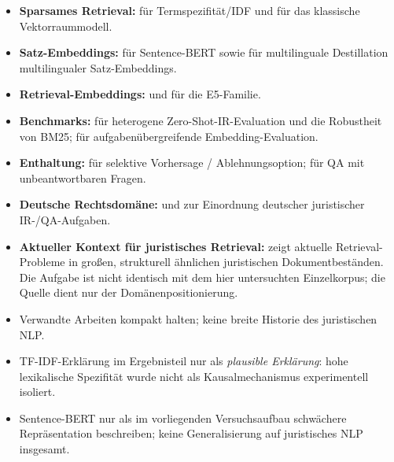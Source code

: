 \documentclass[11pt]{article}
\begin{document}
\begin{quellenbox}
\begin{itemize}
    \item \textbf{Sparsames Retrieval:} \citet{sparckjones1972statistical} f\"ur Termspezifität/IDF und \citet{salton1975vector} f\"ur das klassische Vektorraummodell.
    \item \textbf{Satz-Embeddings:} \citet{reimers-gurevych-2019-sentence} f\"ur Sentence-BERT sowie \citet{reimers-gurevych-2020-making} f\"ur multilinguale Destillation multilingualer Satz-Embeddings.
    \item \textbf{Retrieval-Embeddings:} \citet{wang2022text} und \citet{wang2024multilingual} f\"ur die E5-Familie.
    \item \textbf{Benchmarks:} \citet{thakur2021beir} f\"ur heterogene Zero-Shot-IR-Evaluation und die Robustheit von BM25; \citet{muennighoff-etal-2023-mteb} f\"ur aufgabenübergreifende Embedding-Evaluation.
    \item \textbf{Enthaltung:} \citet{pmlr-v97-geifman19a} f\"ur selektive Vorhersage / Ablehnungsoption; \citet{rajpurkar-etal-2018-know} f\"ur QA mit unbeantwortbaren Fragen.
    \item \textbf{Deutsche Rechtsdom\"ane:} \citet{wrzalik-krechel-2021-gerdalir} und \citet{buttner-habernal-2024-answering} zur Einordnung deutscher juristischer IR-/QA-Aufgaben.
    \item \textbf{Aktueller Kontext für juristisches Retrieval:} \citet{reuter-etal-2025-towards} zeigt aktuelle Retrieval-Probleme in gro\ss en, strukturell \"ahnlichen juristischen Dokumentbest\"anden. Die Aufgabe ist nicht identisch mit dem hier untersuchten Einzelkorpus; die Quelle dient nur der Dom\"anenpositionierung.
\end{itemize}
\end{quellenbox}

\begin{faktenbox}
\begin{itemize}
    \item Verwandte Arbeiten kompakt halten; keine breite Historie des juristischen NLP.
    \item TF-IDF-Erkl\"arung im Ergebnisteil nur als \textit{plausible Erklärung}: hohe lexikalische Spezifit\"at wurde nicht als Kausalmechanismus experimentell isoliert.
    \item Sentence-BERT nur als im vorliegenden Versuchsaufbau schw\"achere Repr\"asentation beschreiben; keine Generalisierung auf juristisches NLP insgesamt.
\end{itemize}
\end{faktenbox}
\end{document}
